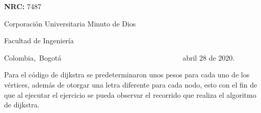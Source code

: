 \documentclass[12pt]{article}
\renewcommand{\_}{\kern-1.5pt\textunderscore\kern-1.5pt}
\begin{document}
\begin{Center}
 
\end{Center}\par

\begin{Center}
\textbf{NRC:} 7487
\end{Center}\par


\vspace{\baselineskip}
\begin{Center}
Corporación Universitaria Minuto de Dios
\end{Center}\par

\begin{Center}
Facultad de Ingeniería
\end{Center}\par

\begin{Center}
Colombia,\ Bogotá\ \ \ \ \ \ \ \ \ \ \ \ \ \ \ \ \ \ \ \ \ \ \ \ \ \ \ \ \ \ \ \ \ \   abril 28 de 2020.
\end{Center}\par


\vspace{\baselineskip}

\vspace{\baselineskip}

\vspace{\baselineskip}

\vspace{\baselineskip}
Para el código de dijkstra se predeterminaron unos pesos para cada uno de los vértices, además de otorgar una letra diferente para cada nodo, esto con el fin de que al ejecutar el ejercicio se pueda observar el recorrido que realiza el algoritmo de dijkstra.\par
\end{document}
